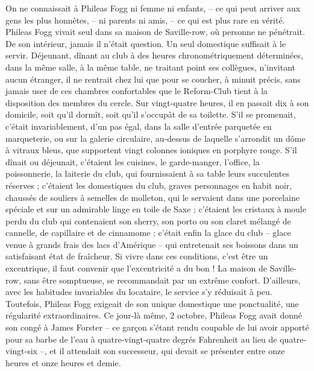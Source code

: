 \documentclass[12pt,a4paper,openany]{book}
\begin{document}
                On ne connaissait à Phileas Fogg ni femme ni enfants, – ce qui peut arriver aux gens les plus honnêtes, – ni parents ni amis, – ce qui est plus rare en vérité. Phileas Fogg vivait seul dans sa maison de Saville-row, où personne ne pénétrait. De son intérieur, jamais il n’était question. Un seul domestique\index[persName]{} suffisait à le servir. Déjeunant, dînant au club à des heures chronométriquement déterminées, dans la même salle, à la même table, ne traitant point ses collègues, n’invitant aucun étranger, il ne rentrait chez lui que pour se coucher, à minuit précis, sans jamais user de ces chambres confortables que le Reform-Club tient à la disposition des membres du cercle. Sur vingt-quatre heures, il en passait dix à son domicile, soit qu’il dormît, soit qu’il s’occupât de sa toilette. S’il se promenait, c’était invariablement, d’un pas égal, dans la salle d’entrée parquetée en marqueterie, ou sur la galerie circulaire, au-dessus de laquelle s’arrondit un dôme à vitraux bleus, que supportent vingt colonnes ioniques en porphyre rouge. S’il dînait ou déjeunait, c’étaient les cuisines, le garde-manger, l’office, la poissonnerie, la laiterie du club, qui fournissaient à sa table leurs succulentes réserves ; c’étaient les domestique\index[persName]{}s du club, graves personnages en habit noir, chaussés de souliers à semelles de molleton, qui le servaient dans une porcelaine spéciale et sur un admirable linge en toile de Saxe ; c’étaient les cristaux à moule perdu du club qui contenaient son sherry, son porto ou son claret mélangé de cannelle, de capillaire et de cinnamome ; c’était enfin la glace du club – glace venue à grands frais des lacs d’Amérique – qui entretenait ses boissons dans un satisfaisant état de fraîcheur.
                Si vivre dans ces conditions, c’est être un excentrique, il faut convenir que l’excentricité a du bon !
                La maison de Saville-row, sans être somptueuse, se recommandait par un extrême confort. D’ailleurs, avec les habitudes invariables du locataire, le service s’y réduisait à peu. Toutefois, Phileas Fogg exigeait de son unique domestique\index[persName]{} une ponctualité, une régularité extraordinaires. Ce jour-là même, 2 octobre, Phileas Fogg avait donné son congé à James Forster\index[persName]{} – ce garçon s’étant rendu coupable de lui avoir apporté pour sa barbe de l’eau à quatre-vingt-quatre degrés Fahrenheit au lieu de quatre-vingt-six –, et il attendait son successeur, qui devait se présenter entre onze heures et onze heures et demie.
\end{document}
